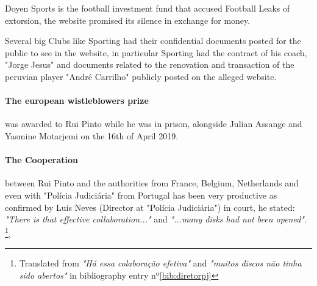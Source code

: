 Doyen Sports is the football investment fund that accused Football Leaks of extorsion, the website promised its silence in exchange for money.

Several big Clubs like Sporting had their confidential documents posted for the public to see in the website, in particular Sporting had the contract of his coach, "Jorge Jesus" and documents related to the renovation and transaction of the peruvian player "André Carrilho" publicly posted on the alleged website.

\paragraph{The european wistleblowers prize} was awarded to Rui Pinto while he was in prison, alongside Julian Assange and Yasmine Motarjemi on the 16th of April 2019.

\paragraph{The Cooperation} between Rui Pinto and the authorities from France, Belgium, Netherlands and even with "Polícia Judiciária" from Portugal has been very productive as confirmed by Luís Neves (Director at "Polícia Judiciária") in court, he stated: \textit{"There is that effective collaboration..."} and \textit{"...many disks had not been opened"}.
\footnote{ Translated from \textit{"Há essa colaboração efetiva"} and \textit{"muitos discos não tinha sido abertos"} in bibliography entry nº\ref{bib:diretorpj} },  



